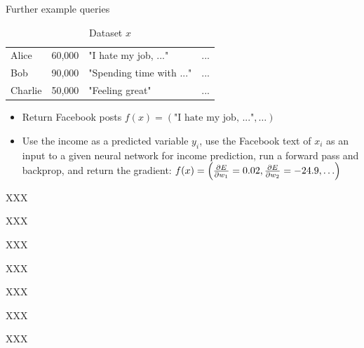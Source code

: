 \documentclass[12pt,aspectratio=169,handout]{beamer}
\begin{document}
\begin{frame}{Further example queries}
	\begin{table}
		\begin{tabular}{lrll}
			\toprule
			Alice & 60,000 & "I hate my job, ..." & ... \\
			Bob & 90,000 & "Spending time with ..." & ...\\
			Charlie & 50,000 & "Feeling great" & ...\\
			\bottomrule
		\end{tabular}
		\caption{Dataset $x$}
	\end{table}	

\begin{itemize}
	\item Return Facebook posts $f(x) = (\text{"I hate my job, ..."}, \ldots)$
	\item Use the income as a predicted variable $y_i$, use the Facebook text of $x_i$ as an input to a given neural network for income prediction, run a forward pass and backprop, and return the gradient: $f(x) = \left( \pdv{E}{w_1} = 0.02, \pdv{E}{w_2} = -24.9, \ldots \right)$
\end{itemize}

	
\end{frame}


\begin{frame}{XXX}
	
\end{frame}


\begin{frame}{XXX}
	
\end{frame}


\begin{frame}{XXX}
	
\end{frame}


\begin{frame}{XXX}
	
\end{frame}


\begin{frame}{XXX}
	
\end{frame}


\begin{frame}{XXX}
	
\end{frame}


\begin{frame}{XXX}
	
\end{frame}
\end{document}
